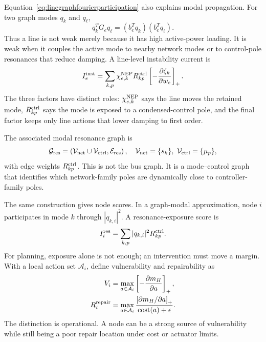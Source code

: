 \documentclass[journal]{IEEEtran}
\begin{document}
Equation~\eqref{eq:linegraphfourierparticipation} also explains modal propagation. For two graph modes $q_k$ and $q_\ell$,
\begin{equation}
q_k^TG_eq_\ell=(b_e^Tq_k)(b_e^Tq_\ell).
\label{eq:linecrossmodal}
\end{equation}
Thus a line is not weak merely because it has high active-power loading. It is weak when it couples the active mode to nearby network modes or to control-pole resonances that reduce damping. A line-level instability current is
\begin{equation}
I_e^{\rm inst}
=
\sum_{k,p}
\chi_{e,k}^{\rm NEP}
R_{kp}^{\rm ctrl}
\left[-\frac{\partial\zeta_k}{\partial w_e}\right]_+ .
\label{eq:lineinstabilitycurrent}
\end{equation}
The three factors have distinct roles: $\chi_{e,k}^{\rm NEP}$ says the line moves the retained mode, $R_{kp}^{\rm ctrl}$ says the mode is exposed to a condensed-control pole, and the final factor keeps only line actions that lower damping to first order.

The associated modal resonance graph is
\begin{equation}
\mathcal{G}_{\rm res}
=
\left(\mathcal{V}_{\rm net}\cup\mathcal{V}_{\rm ctrl},
\mathcal{E}_{\rm res}\right),
\quad
\mathcal{V}_{\rm net}=\{s_k\},\ 
\mathcal{V}_{\rm ctrl}=\{\mu_p\},
\label{eq:modalresonancegraph}
\end{equation}
with edge weights $R_{kp}^{\rm ctrl}$. This is not the bus graph. It is a mode--control graph that identifies which network-family poles are dynamically close to controller-family poles.

The same construction gives node scores. In a graph-modal approximation, node $i$ participates in mode $k$ through $|q_{k,i}|^2$. A resonance-exposure score is
\begin{equation}
I_i^{\rm res}
=
\sum_{k,p}|q_{k,i}|^2R_{kp}^{\rm ctrl}.
\label{eq:noderesonanceexposure}
\end{equation}
For planning, exposure alone is not enough; an intervention must move a margin. With a local action set $\mathcal{A}_i$, define vulnerability and repairability as
\begin{align}
V_i
&=
\max_{a\in\mathcal{A}_i}
\left[-\frac{\partial m_H}{\partial a}\right]_+,
\label{eq:nodevulnerability}\\
R_i^{\rm repair}
&=
\max_{a\in\mathcal{A}_i}
\frac{\left[\partial m_H/\partial a\right]_+}
{\operatorname{cost}(a)+\epsilon}.
\label{eq:noderepairability}
\end{align}
The distinction is operational. A node can be a strong source of vulnerability while still being a poor repair location under cost or actuator limits.
\end{document}
